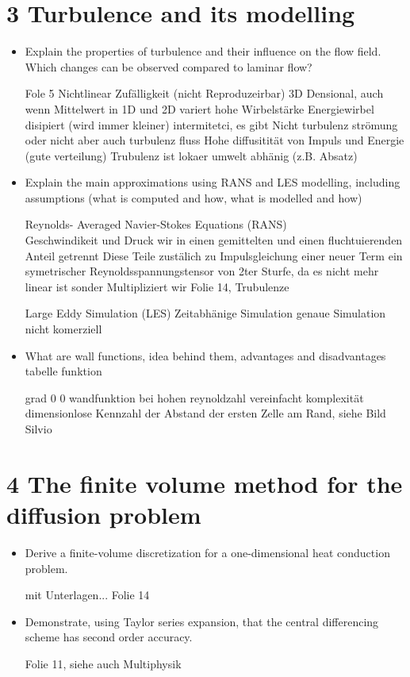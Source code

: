 \documentclass[a4paper]{scrartcl}
\begin{document}
\section{3 Turbulence and its modelling}
\begin{itemize}
\item Explain the properties of turbulence and their influence on the flow field. Which changes can be observed compared to laminar flow?

Fole 5
Nichtlinear
Zufälligkeit (nicht Reproduzeirbar)
3D Densional, auch wenn Mittelwert in 1D und 2D variert
hohe Wirbelstärke
Energiewirbel disipiert (wird immer kleiner)
intermitetci, es gibt Nicht turbulenz strömung oder nicht aber auch turbulenz fluss
Hohe diffusitität von Impuls und Energie (gute verteilung)
Trubulenz ist lokaer umwelt abhänig (z.B. Absatz)

\item Explain the main approximations using RANS and LES modelling, including assumptions (what is computed and how, what is modelled and how)

Reynolds- Averaged Navier-Stokes Equations (RANS)\\
Geschwindikeit und Druck wir in einen gemittelten und einen fluchtuierenden Anteil getrennt
Diese Teile zustälich zu Impulsgleichung
einer neuer Term ein symetrischer Reynoldsspannungstensor von 2ter Sturfe, da es nicht mehr linear ist sonder Multipliziert wir
Folie 14, Trubulenze

Large Eddy Simulation (LES)
Zeitabhänige Simulation
genaue Simulation nicht komerziell


\item What are wall functions, idea behind them, advantages and disadvantages tabelle funktion

grad 0
0
wandfunktion bei hohen reynoldzahl vereinfacht komplexität
dimensionlose Kennzahl der Abstand der ersten Zelle am Rand, siehe Bild Silvio

\end{itemize}


\section{4 The finite volume method for the diffusion problem}
\begin{itemize}

\item Derive a finite-volume discretization for a one-dimensional heat conduction problem. 

mit Unterlagen... Folie 14

\item Demonstrate, using Taylor series expansion, that the central differencing scheme has second order accuracy.

Folie 11, siehe auch Multiphysik


\end{itemize}
\end{document}
